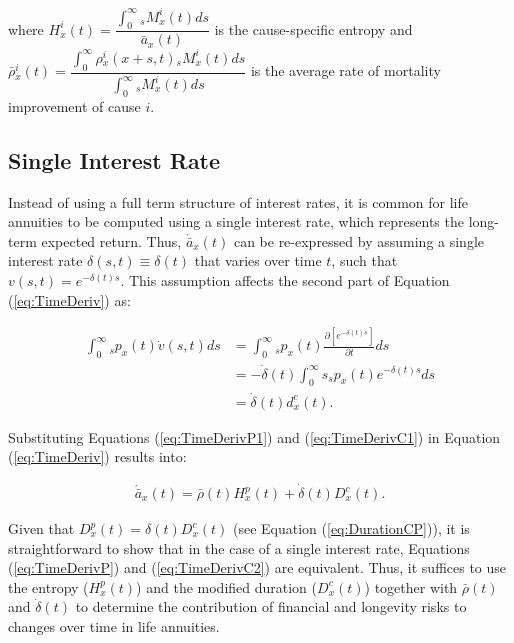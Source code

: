 \documentclass[12pt]{article}
\begin{document}
where ${H}^{i}_x(t)=\dfrac{\int_{0}^{\infty}{}_sM^{i}_x(t)ds}{\bar{a} _x(t)}$ is the cause-specific entropy and $\bar{\rho}{^i_x}(t)=\dfrac{\int_{0}^{\infty}\rho{_x^i}(x+s,t) {}_sM^{i}_x(t)ds}{\int_{0}^{\infty}{}_sM^{i}_x(t)ds}$ is the average rate of mortality improvement of cause $i$.

\subsection{Single Interest Rate}

Instead of using a full term structure of interest rates, it is common for life annuities to be computed using a single interest rate, which represents the long-term expected return. Thus, $\acute{\bar{a}}_x(t)$ can be re-expressed by assuming a single interest rate $\delta(s,t)\equiv \delta(t)$ that varies over time $t$, such that $v(s,t) = e^{-\delta(t) s}$. This assumption affects the second part of Equation (\ref{eq:TimeDeriv}) as:


\begin{equation}\label{eq:TimeDerivC1}
\begin{split}
\int_0^\infty {}_s{p}_x(t) \dot{v}(s,t)ds &=\int_0^\infty {}_s{p}_x(t) \frac{\partial \left[ e^{-\delta(t)s} \right]}{\partial t}ds \\
&=-\dot{\delta}(t)\int_0^\infty s  {}_s{p}_x(t) e^{-\delta(t)s} ds \\
&=  \dot{\delta}(t)  d^{c}_x(t).
\end{split}
\end{equation}

Substituting Equations (\ref{eq:TimeDerivP1}) and (\ref{eq:TimeDerivC1}) in Equation (\ref{eq:TimeDeriv}) results into: 


\begin{equation}\label{eq:TimeDerivC2}
\begin{split}
\acute{\bar{a}}_x(t) =  \bar{\rho}(t){H}^{p}_x(t)+\dot{\delta}(t)  D^{c}_x(t).
\end{split}
\end{equation}


Given that ${D}^{p}_{x}(t) = \delta(t){D}^{c}_{x}(t)$ (see Equation (\ref{eq:DurationCP})), it is straightforward to show that in the case of a single interest rate, Equations (\ref{eq:TimeDerivP}) and (\ref{eq:TimeDerivC2}) are equivalent. Thus, it suffices to use the entropy (${H}^{p}_x(t)$) and the modified duration (${D}^{c}_x(t)$) together with $\bar{\rho}(t)$ and $\dot{\delta}(t)$ to determine the contribution of financial and longevity risks to changes over time in life annuities.
\end{document}
